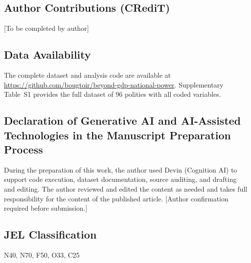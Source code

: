 \documentclass[pdflatex,sn-basic]{sn-jnl}
\theoremstyle{thmstyleone}%
\theoremstyle{thmstyletwo}%
\theoremstyle{thmstylethree}%
\begin{document}
\subsection*{Author Contributions (CRediT)}
[To be completed by author]

\subsection*{Data Availability}
The complete dataset and analysis code are available at \url{https://github.com/bougtoir/beyond-gdp-national-power}. Supplementary Table~S1 provides the full dataset of 96 polities with all coded variables.

\subsection*{Declaration of Generative AI and AI-Assisted Technologies in the Manuscript Preparation Process}
During the preparation of this work, the author used Devin (Cognition AI) to support code execution, dataset documentation, source auditing, and drafting and editing. The author reviewed and edited the content as needed and takes full responsibility for the content of the published article. [Author confirmation required before submission.]

\subsection*{JEL Classification}
N40, N70, F50, O33, C25


\end{document}
